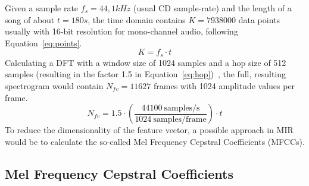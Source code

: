 Given a sample rate $f_s = 44,1kHz$ (usual CD sample-rate) and the length of a song of about $t = 180s$, the time domain contains $K = 7938000$ data points usually with 16-bit resolution for mono-channel audio, following Equation~\eqref{eq:points}. 
\begin{equation} \label{eq:points}
K = f_s \cdot t
\end{equation}
Calculating a DFT with a window size of 1024 samples and a hop size of 512 samples (resulting in the factor 1.5 in Equation~\eqref{eq:hop})~\cite[p. 41]{knees1}, the full, resulting spectrogram would contain $N_{fv} = 11627$ frames with 1024 amplitude values per frame.
\begin{equation} \label{eq:hop}
N_{fv} = 1.5 \cdot (\frac{44100 \ \text{samples/s}}{1024 \ \text{samples/frame}}) \cdot t
\end{equation}
To reduce the dimensionality of the feature vector, a possible approach in MIR would be to calculate the so-called Mel Frequency Cepstral Coefficients (MFCCs).

\subsection{Mel Frequency Cepstral Coefficients}\label{mfccsim}

